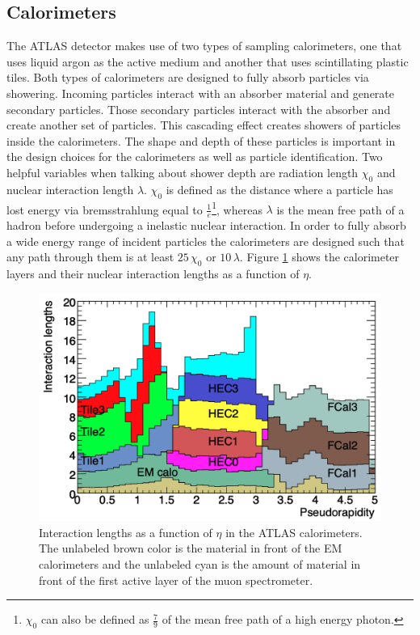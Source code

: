 	\subsection{Calorimeters}\label{ssec:calorimeters}
		The ATLAS detector makes use of two types of sampling calorimeters, one that uses liquid argon as the active medium and another that uses scintillating plastic tiles. Both types of calorimeters are designed to fully absorb particles via showering. Incoming particles interact with an absorber material and generate secondary particles. Those secondary particles interact with the absorber and create another set of particles. This cascading effect creates showers of particles inside the calorimeters. The shape and depth of these particles is important in the design choices for the calorimeters as well as particle identification. Two helpful variables when talking about shower depth are radiation length $\chi_0$ and nuclear interaction length $\lambda$. $\chi_0$ is defined as the distance where a particle has lost energy via bremsstrahlung equal to $\frac{1}{e}$\footnote{$\chi_0$ can also be defined as $\frac{7}{9}$ of the mean free path of a high energy photon.}, whereas $\lambda$ is the mean free path of a hadron before undergoing a inelastic nuclear interaction. In order to fully absorb a wide energy range of incident particles the calorimeters are designed such that any path through them is at least $25 \, \chi_0$ or $10 \, \lambda$. Figure \ref{fig:calo-interaction-length} shows the calorimeter layers and their nuclear interaction lengths as a function of $\eta$.

		\begin{figure}[!ht]
		\centering
		\includegraphics[width=.65\textwidth,keepaspectratio=true]{chapters/chapter3_experiment/images/Calo_Interaction_Lengths.png}
		\caption{ Interaction lengths as a function of $\eta$ in the \gls{ATLAS} calorimeters. The unlabeled brown color is the material in front of the EM calorimeters and the unlabeled cyan is the amount of material in front of the first active layer of the muon spectrometer. \cite{atlas-experiment}}
		\label{fig:calo-interaction-length}
		\end{figure}

